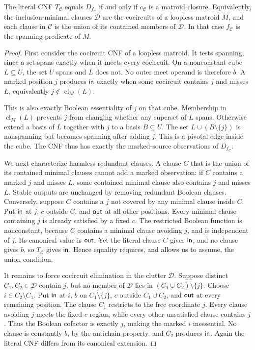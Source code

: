 \begin{theorem}
\label{core:thm:essential-cnf-matroid}
The literal CNF $T_{\mathcal C}$ equals $D_{f_{\mathcal C}}$ if and
only if $c_{\mathcal C}$ is a matroid closure. Equivalently, the
inclusion-minimal clauses $\mathcal D$ are the cocircuits of a loopless
matroid $M$, and each clause in $\mathcal C$ is the union of its
contained members of $\mathcal D$. In that case $f_{\mathcal C}$ is
the spanning predicate of $M$.
\end{theorem}
\begin{proof}
First consider the cocircuit CNF of a loopless matroid. It tests spanning,
since a set spans exactly when it meets every cocircuit. On a nonconstant
cube $L\subseteq U$, the set $U$ spans and $L$ does not. No outer
meet operand is therefore $b$. A marked position $j$ produces
$\mathsf{in}$ exactly when some cocircuit contains $j$ and misses $L$,
equivalently $j\notin\operatorname{cl}_M(L)$.

This is also exactly Boolean essentiality of $j$ on that cube.
Membership in $\operatorname{cl}_M(L)$ prevents $j$ from changing
whether any superset of $L$ spans. Otherwise extend a basis of $L$
together with $j$ to a basis $B\subseteq U$. The set
$L\cup(B\setminus\{j\})$ is nonspanning but becomes spanning after
adding $j$. This is a pivotal edge inside the cube. The CNF thus has
exactly the marked-source observations of $D_{f_{\mathcal C}}$.

We next characterize harmless redundant clauses. A clause $C$ that is
the union of its contained minimal clauses cannot add a marked observation:
if $C$ contains a marked $j$ and misses $L$, some contained minimal clause
also contains $j$ and misses $L$. Stable outputs are unchanged by removing
redundant Boolean clauses. Conversely, suppose $C$ contains a $j$ not
covered by any minimal clause inside $C$. Put $\mathsf{in}$ at $j$,
$c$ outside $C$, and $\mathsf{out}$ at all other positions.
Every minimal clause containing $j$ is already satisfied by a fixed $c$.
The restricted Boolean function is nonconstant, because $C$ contains a
minimal clause avoiding $j$, and is independent of $j$. Its canonical
value is $\mathsf{out}$. Yet the literal clause $C$ gives $\mathsf{in}$,
and no clause gives $b$, so $T_{\mathcal C}$ gives $\mathsf{in}$.
Hence equality requires, and allows us to assume, the union condition.

It remains to force cocircuit elimination in the clutter $\mathcal D$.
Suppose distinct $C_1,C_2\in\mathcal D$ contain $j$, but no member
of $\mathcal D$ lies in $(C_1\cup C_2)\setminus\{j\}$.
Choose $i\in C_2\setminus C_1$. Put $\mathsf{in}$ at $i$, $b$ on
$C_1\setminus\{j\}$, $c$ outside $C_1\cup C_2$, and
$\mathsf{out}$ at every remaining position. The clause $C_1$ restricts
to the free coordinate $j$. Every clause avoiding $j$ meets the fixed-$c$
region, while every other unsatisfied clause contains $j$. Thus the
Boolean cofactor is exactly $j$, making the marked $i$ inessential.
No clause is constantly $b$, by the antichain property, and $C_2$
produces $\mathsf{in}$. Again the literal CNF differs from its canonical
extension.


\end{proof}
